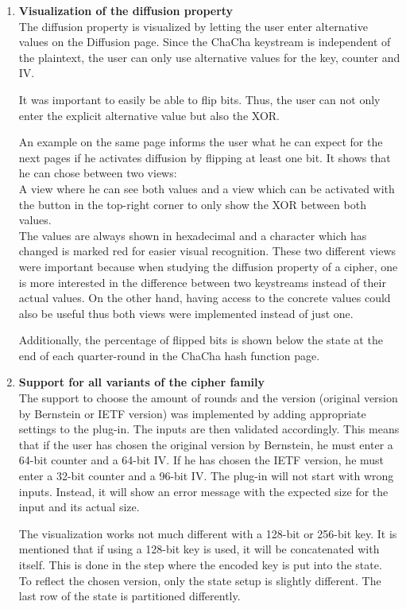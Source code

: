 \begin{enumerate}[label=(\labelenum{G}{{\arabic*}}), wide, labelwidth=!, labelindent=0pt]
     \item \textbf{Visualization of the diffusion property}\\
     The diffusion property is visualized by letting the user enter alternative values on the Diffusion page. Since the ChaCha keystream is independent of the plaintext, the user can only use alternative values for the key, counter and IV.
     
     It was important to easily be able to flip bits. Thus, the user can not only enter the explicit alternative value but also the XOR.
     
     An example on the same page informs the user what he can expect for the next pages if he activates diffusion by flipping at least one bit. It shows that he can chose between two views: \\
     A view where he can see both values and a view which can be activated with the button in the top-right corner to only show the XOR between both values.\\
     The values are always shown in hexadecimal and a character which has changed is marked red for easier visual recognition. These two different views were important because when studying the diffusion property of a cipher, one is more interested in the difference between two keystreams instead of their actual values. On the other hand, having access to the concrete values could also be useful thus both views were implemented instead of just one.
     
     Additionally, the percentage of flipped bits is shown below the state at the end of each quarter-round in the ChaCha hash function page.
     
     \item \textbf{Support for all variants of the cipher family}\\
     The support to choose the amount of rounds and the version (original version by Bernstein or IETF version) was implemented by adding appropriate settings to the plug-in. The inputs are then validated accordingly. This means that if the user has chosen the original version by Bernstein, he must enter a 64-bit counter and a 64-bit IV. If he has chosen the IETF version, he must enter a 32-bit counter and a 96-bit IV. The plug-in will not start with wrong inputs. Instead, it will show an error message with the expected size for the input and its actual size.
     
     The visualization works not much different with a 128-bit or 256-bit key. It is mentioned that if using a 128-bit key is used, it will be concatenated with itself. This is done in the step where the encoded key is put into the state.\\
     To reflect the chosen version, only the state setup is slightly different. The last row of the state is partitioned differently.
  \end{enumerate}

